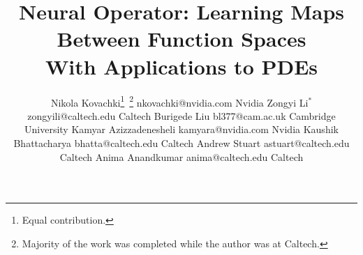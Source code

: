 \documentclass[twoside,11pt]{article}
\newcommand{\kamyar}[1]{\textcolor{red}{Kamyar:~#1}}
\begin{document}
\title{
Neural Operator: Learning Maps Between Function Spaces \\ With Applications to PDEs
}



\renewcommand{\thefootnote}{\fnsymbol {footnote}}

\author{\name Nikola Kovachki\thanks{Equal contribution.} \,\thanks{Majority of the work was completed while the author was at Caltech.} \email nkovachki@nvidia.com \addr Nvidia
\AND \name Zongyi Li$^*$ \email zongyili@caltech.edu \addr Caltech
\AND \name Burigede Liu \email bl377@cam.ac.uk \addr Cambridge University
\AND \name Kamyar Azizzadenesheli \email kamyara@nvidia.com \addr  Nvidia
\AND \name Kaushik Bhattacharya \email bhatta@caltech.edu \addr Caltech
\AND \name Andrew Stuart \email astuart@caltech.edu \addr Caltech
\AND \name Anima Anandkumar \email anima@caltech.edu \addr Caltech
}


%

\end{document}
